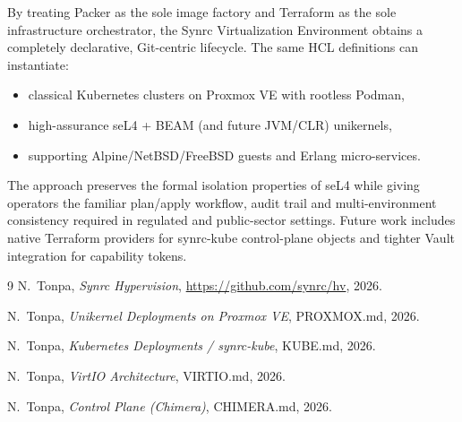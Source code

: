 \documentclass{article}
\begin{document}
By treating Packer as the sole image factory and Terraform as the sole infrastructure orchestrator, the Synrc Virtualization Environment obtains a completely declarative, Git-centric lifecycle. The same HCL definitions can instantiate:

\begin{itemize}
  \item classical Kubernetes clusters on Proxmox VE with rootless Podman,
  \item high-assurance seL4 + BEAM (and future JVM/CLR) unikernels,
  \item supporting Alpine/NetBSD/FreeBSD guests and Erlang micro-services.
\end{itemize}

The approach preserves the formal isolation properties of seL4 while giving operators the familiar plan/apply workflow, audit trail and multi-environment consistency required in regulated and public-sector settings. Future work includes native Terraform providers for synrc-kube control-plane objects and tighter Vault integration for capability tokens.

\begin{thebibliography}{9}
N.~Tonpa, \emph{Synrc Hypervision}, \url{https://github.com/synrc/hv}, 2026.

N.~Tonpa, \emph{Unikernel Deployments on Proxmox VE}, PROXMOX.md, 2026.

N.~Tonpa, \emph{Kubernetes Deployments / synrc-kube}, KUBE.md, 2026.

N.~Tonpa, \emph{VirtIO Architecture}, VIRTIO.md, 2026.

N.~Tonpa, \emph{Control Plane (Chimera)}, CHIMERA.md, 2026.
\end{thebibliography}
\end{document}
